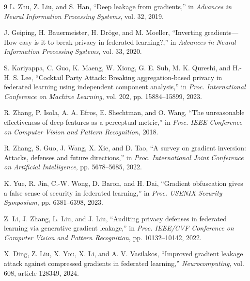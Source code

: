 \documentclass{article}
\begin{document}
\begin{thebibliography}{9}
L. Zhu, Z. Liu, and S. Han,
``Deep leakage from gradients,''
in \emph{Advances in Neural Information Processing Systems}, vol. 32, 2019.

J. Geiping, H. Bauermeister, H. Dr\"oge, and M. Moeller,
``Inverting gradients---How easy is it to break privacy in federated learning?,''
in \emph{Advances in Neural Information Processing Systems}, vol. 33, 2020.

S. Kariyappa, C. Guo, K. Maeng, W. Xiong, G. E. Suh,
M. K. Qureshi, and H.-H. S. Lee,
``Cocktail Party Attack: Breaking aggregation-based privacy in federated
learning using independent component analysis,''
in \emph{Proc. International Conference on Machine Learning},
vol. 202, pp. 15884--15899, 2023.

R. Zhang, P. Isola, A. A. Efros, E. Shechtman, and O. Wang,
``The unreasonable effectiveness of deep features as a perceptual metric,''
in \emph{Proc. IEEE Conference on Computer Vision and Pattern Recognition},
2018.

R. Zhang, S. Guo, J. Wang, X. Xie, and D. Tao,
``A survey on gradient inversion: Attacks, defenses and future directions,''
in \emph{Proc. International Joint Conference on Artificial Intelligence},
pp. 5678--5685, 2022.

K. Yue, R. Jin, C.-W. Wong, D. Baron, and H. Dai,
``Gradient obfuscation gives a false sense of security in federated learning,''
in \emph{Proc. USENIX Security Symposium}, pp. 6381--6398, 2023.

Z. Li, J. Zhang, L. Liu, and J. Liu,
``Auditing privacy defenses in federated learning via generative gradient leakage,''
in \emph{Proc. IEEE/CVF Conference on Computer Vision and Pattern Recognition},
pp. 10132--10142, 2022.

X. Ding, Z. Liu, X. You, X. Li, and A. V. Vasilakos,
``Improved gradient leakage attack against compressed gradients in federated learning,''
\emph{Neurocomputing}, vol. 608, article 128349, 2024.
\end{thebibliography}
\end{document}
